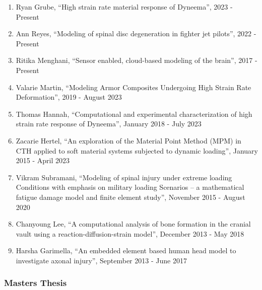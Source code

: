 \documentclass[11pt]{article}
\begin{document}
\begin{enumerate}
\item
  Ryan Grube, ``High strain rate material response of Dyneema'', 2023 - Present
\item
  Ann Reyes, ``Modeling of spinal disc degeneration in fighter jet pilots'', 2022 - Present
\item
  Ritika Menghani, ``Sensor enabled, cloud-based modeling of the brain'', 2017 - Present
\item
  Valarie Martin, ``Modeling Armor Composites Undergoing High Strain Rate Deformation'', 2019 - August 2023
\item
  Thomas Hannah, ``Computational and experimental characterization of high strain rate response of Dyneema'', January 2018 - July 2023
\item
  Zacarie Hertel, ``An exploration of the Material Point Method (MPM) in CTH applied to soft material systems subjected to dynamic loading'', January 2015 - April 2023
\item
  Vikram Subramani, ``Modeling of spinal injury under extreme loading Conditions with emphasis on military loading Scenarios -- a mathematical fatigue damage model and finite element study'', November 2015 - August 2020
\item
  Chanyoung Lee, ``A computational analysis of bone formation in the cranial vault using a reaction-diffusion-strain model'', December 2013 - May 2018
\item
  Harsha Garimella, ``An embedded element based human head model to investigate axonal injury'', September 2013 - June 2017
\end{enumerate}

\subsubsection{Master\textquotesingle s Thesis}\label{masters-thesis}
\end{document}
